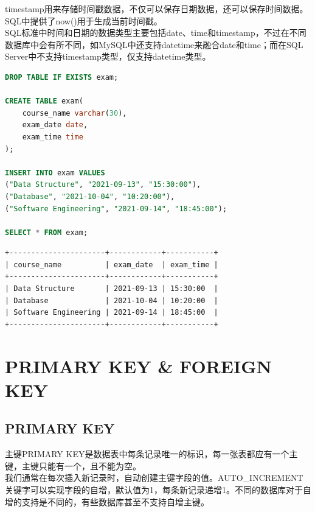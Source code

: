 \documentclass[12pt, openany, oneside]{book}
\begin{document}
timestamp用来存储时间戳数据，不仅可以保存日期数据，还可以保存时间数据。SQL中提供了now()用于生成当前时间戳。\\

SQL标准中时间和日期的数据类型主要包括date、time和timestamp，不过在不同数据库中会有所不同，如MySQL中还支持datetime来融合date和time；而在SQL Server中不支持timestamp类型，仅支持datetime类型。\\


\begin{lstlisting}[language=SQL]
DROP TABLE IF EXISTS exam;

CREATE TABLE exam(
	course_name varchar(30),
	exam_date date,
	exam_time time
);

INSERT INTO exam VALUES
("Data Structure", "2021-09-13", "15:30:00"),
("Database", "2021-10-04", "10:20:00"),
("Software Engineering", "2021-09-14", "18:45:00");

SELECT * FROM exam;
\end{lstlisting}

\begin{tcolorbox}
\begin{verbatim}
+----------------------+------------+-----------+
| course_name          | exam_date  | exam_time |
+----------------------+------------+-----------+
| Data Structure       | 2021-09-13 | 15:30:00  |
| Database             | 2021-10-04 | 10:20:00  |
| Software Engineering | 2021-09-14 | 18:45:00  |
+----------------------+------------+-----------+
	\end{verbatim}
\end{tcolorbox}

\newpage

\chapter{PRIMARY KEY \& FOREIGN KEY}

\section{PRIMARY KEY}

主键PRIMARY KEY是数据表中每条记录唯一的标识，每一张表都应有一个主键，主键只能有一个，且不能为空。\\

我们通常在每次插入新记录时，自动创建主键字段的值。AUTO\_INCREMENT关键字可以实现字段的自增，默认值为1，每条新记录递增1。不同的数据库对于自增的支持是不同的，有些数据库甚至不支持自增主键。\\
\end{document}
